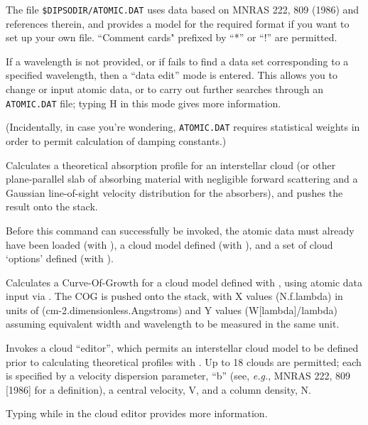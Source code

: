\begin {description}
The file {\tt{\$DIPSODIR/ATOMIC.DAT}}  uses data based on MNRAS 222, 809 (1986)
and references therein, and provides a model for the required format
if you want to set up your own file.
``Comment cards" prefixed by ``*'' or ``!'' are permitted.

If a wavelength is not provided, or if   fails to find a data set
corresponding to a specified wavelength, then a ``data edit'' mode is
entered. This allows you to change or input atomic data, or to carry
out further searches through an {\tt{ATOMIC.DAT}}  file; typing H in
this mode gives more information.

(Incidentally, in case you're wondering, {\tt{ATOMIC.DAT}}  requires
statistical weights in order to permit calculation of damping
constants.)

Calculates a theoretical absorption profile for an interstellar cloud
(or other plane-parallel slab of absorbing material with negligible
forward scattering and a Gaussian line-of-sight velocity distribution
for the absorbers), and pushes the result onto the stack.

Before this command can successfully be invoked, the atomic data must
already have been loaded (with ),  a cloud model defined (with
),  and a set of cloud `options' defined (with ). 

Calculates a Curve-Of-Growth for a cloud model defined with , 
using atomic data input via .  The COG is pushed onto the stack,
with X values (N.f.lambda) in units of (cm-2.dimensionless.Angstroms)
and Y values (W[lambda]/lambda) assuming equivalent width and
wavelength to be measured in the same unit.

Invokes a cloud ``editor'', which permits an interstellar cloud model
to be defined prior to calculating theoretical profiles with . 
Up to 18 clouds are permitted; each is specified by a velocity
dispersion parameter, ``b'' (see, {\em e.g.}, MNRAS 222, 809 [1986]
for a definition), a central velocity, V, and a column density, N.

Typing   while in the cloud editor provides more information.


\end{description}
